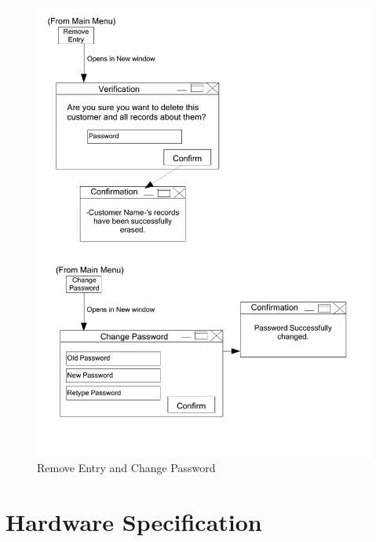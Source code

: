 \begin{figure}[H]
    \caption{Remove Entry and Change Password} \label{Remove_Entry_and_Change_Password.pdf}
    \includegraphics[width=\textwidth]{./Design/UserInterfaceDesign/Remove_Entry_and_Change_Password.pdf}
\end{figure}


\section{Hardware Specification}

